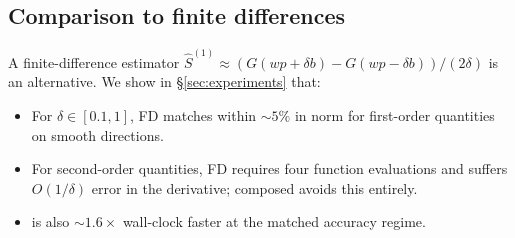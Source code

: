 \subsection{Comparison to finite differences}
A finite-difference estimator
$\hat S^{(1)} \approx (G(wp + \delta b) - G(wp - \delta b))/(2\delta)$
is an alternative. We show in \S\ref{sec:experiments} that:
\begin{itemize}
\item For $\delta \in [0.1, 1]$, FD matches \jvp within $\sim 5\%$ in
      norm for first-order quantities on smooth directions.
\item For second-order quantities, FD requires four function
      evaluations and suffers $O(1/\delta)$ error in the derivative;
      composed \jvp avoids this entirely.
\item \jvp is also $\sim 1.6\times$ wall-clock faster at the matched
      accuracy regime.
\end{itemize}
